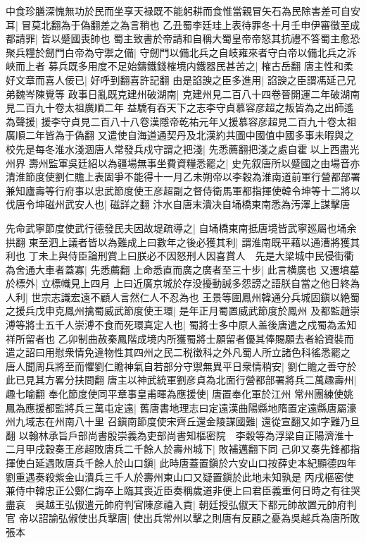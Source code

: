 中食珍膳深愧無功於民而坐享天禄既不能躬耕而食惟當親冒矢石為民除害差可自安耳|{
	冒莫北翻為于偽翻差之為言稍也}
乙丑蜀李廷珪上表待罪冬十月壬申伊審徵至成都請罪|{
	皆以蹙國喪帥也}
蜀主致書於帝請和自稱大蜀皇帝帝怒其抗禮不答蜀主愈恐聚兵糧於劒門白帝為守禦之備|{
	守劒門以備北兵之自岐雍來者守白帝以備北兵之泝峽而上者}
募兵既多用度不足始鑄鐵錢榷境内鐵器民甚苦之|{
	榷古岳翻}
唐主性和柔好文章而喜人佞已|{
	好呼到翻喜許記翻}
由是諂諛之臣多進用|{
	諂諛之臣謂馮延己兄弟魏岑陳覺等}
政事日亂既克建州破湖南|{
	克建州見二百八十四卷晉開運二年破湖南見二百九十卷太祖廣順二年}
益驕有吞天下之志李守貞慕容彦超之叛皆為之出師遙為聲援|{
	援李守貞見二百八十八卷漢隱帝乾祐元年乂援慕容彦超見二百九十卷太祖廣順二年皆為于偽翻}
又遣使自海道通契丹及北漢約共圖中國值中國多事未暇與之校先是每冬淮水淺涸唐人常發兵戍守謂之把淺|{
	先悉薦翻把淺之處自霍以上西盡光州界}
壽州監軍吳廷紹以為疆場無事坐費資糧悉罷之|{
	史先叙唐所以蹙國之由場音亦}
清淮節度使劉仁贍上表固爭不能得十一月乙未朔帝以李穀為淮南道前軍行營都部署兼知廬壽等行府事以忠武節度使王彦超副之督侍衛馬軍都指揮使韓令坤等十二將以伐唐令坤磁州武安人也|{
	磁詳之翻}
汴水自唐末潰决自埇橋東南悉為汚澤上謀擊唐

先命武寧節度使武行德發民夫因故堤疏導之|{
	自埇橋東南抵唐境皆武寧廵屬也埇余拱翻}
東至泗上議者皆以為難成上曰數年之後必獲其利|{
	謂淮南既平藉以通漕將獲其利也}
丁未上與侍臣論刑賞上曰朕必不因怒刑人因喜賞人　先是大梁城中民侵街衢為舍通大車者蓋寡|{
	先悉薦翻}
上命悉直而廣之廣者至三十步|{
	此言横廣也}
又遷墳墓於標外|{
	立標幟見上四月}
上曰近廣京城於存没擾動誠多怨謗之語朕自當之他日終為人利|{
	世宗志識宏遠不顧人言然仁人不忍為也}
王景等圍鳳州韓通分兵城固鎭以絶蜀之援兵戊申克鳳州擒蜀威武節度使王環|{
	是年正月蜀置威武節度於鳳州}
及都監趙崇溥等將士五千人崇溥不食而死環真定人也|{
	蜀將士多中原人盖後唐遣之戍蜀為孟知祥所留者也}
乙卯制曲赦秦鳳階成境内所獲蜀將士願留者優其俸賜願去者給資裝而遣之詔曰用慰衆情免違物性其四州之民二税徵科之外凡蜀人所立諸色科徭悉罷之　唐人聞周兵將至而懼劉仁贍神氣自若部分守禦無異平日衆情稍安|{
	劉仁贍之善守於此已見其方畧分扶問翻}
唐主以神武統軍劉彦貞為北面行營都部署將兵二萬趣壽州|{
	趣七喻翻}
奉化節度使同平章事皇甫暉為應援使|{
	唐置奉化軍於江州}
常州團練使姚鳳為應援都監將兵三萬屯定遠|{
	舊唐書地理志曰定遠漢曲陽縣地隋置定遠縣唐屬濠州九域志在州南八十里}
召鎭南節度使宋齊丘還金陵謀國難|{
	還從宣翻又如字難乃旦翻}
以翰林承旨戶部尚書殷崇義為吏部尚書知樞密院　李穀等為浮梁自正陽濟淮十二月甲戌穀奏王彦超敗唐兵二千餘人於壽州城下|{
	敗補邁翻下同}
己卯又奏先鋒都指揮使白延遇敗唐兵千餘人於山口鎭|{
	此時唐蓋置鎭於六安山口按薛史本紀顯德四年劉重遇奏殺紫金山潰兵三千人於壽州東山口又疑置鎭於此地未知孰是}
丙戌樞密使兼侍中韓忠正公鄭仁誨卒上臨其喪近臣奏稱歲道非便上曰君臣義重何日時之有往哭盡哀　吳越王弘俶遣元帥府判官陳彦禧入貢|{
	朝廷授弘俶天下都元帥故置元帥府判官}
帝以詔諭弘俶使出兵擊唐|{
	使出兵常州以擊之則唐有反顧之憂為吳越兵為唐所敗張本}


